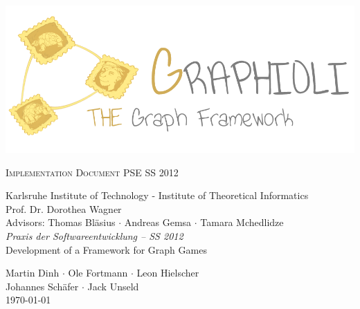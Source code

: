\begin{titlepage}
\begin{center}

\begin{minipage}{1\linewidth}
	\vspace{2cm}
	\includegraphics[width=\textwidth]{../../materials/images/logo.png}
	\vspace{2cm}
\end{minipage}
	
\fontsize{40}{50}\selectfont
        \textsc{Implementation Document}
        \vfill
\Large
PSE SS 2012
  \vfill
 \newpage
 
 \null
 \vfill
 \fontsize{12}{16}\selectfont
 Karlsruhe Institute of Technology - Institute of Theoretical Informatics \\
 Prof. Dr. Dorothea Wagner \\
 \vspace{.5cm}
 Advisors: Thomas Bläsius $\cdot$ Andreas Gemsa $\cdot$ Tamara Mchedlidze \\
 
 \vspace{2cm}
 \Large
 \emph{Praxis der Softwareentwicklung -- SS 2012} \\
 Development of a Framework for Graph Games \\
  \medskip
  \vspace{2cm}
  
    Martin Dinh $\cdot$ Ole Fortmann $\cdot$ Leon Hielscher \\ Johannes Schäfer $\cdot$ Jack Unseld
  \vspace{2cm} \\
  \today
\end{center}

  \vfill

\end{titlepage}
